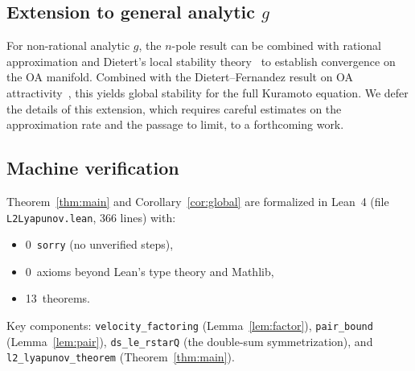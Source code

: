 \documentclass[11pt,a4paper]{article}
\theoremstyle{definition}
\begin{document}
\subsection{Extension to general analytic $g$}

For non-rational analytic $g$, the $n$-pole result can be combined with rational approximation and Dietert's local stability theory~\cite{dietert2016,dietert-fernandez2018} to establish convergence on the OA manifold. Combined with the Dietert--Fernandez result on OA attractivity~\cite{dietert-fernandez2018}, this yields global stability for the full Kuramoto equation. We defer the details of this extension, which requires careful estimates on the approximation rate and the passage to limit, to a forthcoming work.

\subsection{Machine verification}

Theorem~\ref{thm:main} and Corollary~\ref{cor:global} are formalized in Lean~4 (file \texttt{L2Lyapunov.lean}, 366 lines) with:
\begin{itemize}
\item 0~\texttt{sorry} (no unverified steps),
\item 0~axioms beyond Lean's type theory and Mathlib,
\item 13~theorems.
\end{itemize}
Key components: \texttt{velocity\_factoring} (Lemma~\ref{lem:factor}), \texttt{pair\_bound} (Lemma~\ref{lem:pair}), \texttt{ds\_le\_rstarQ} (the double-sum symmetrization), and \texttt{l2\_lyapunov\_theorem} (Theorem~\ref{thm:main}).
\end{document}
